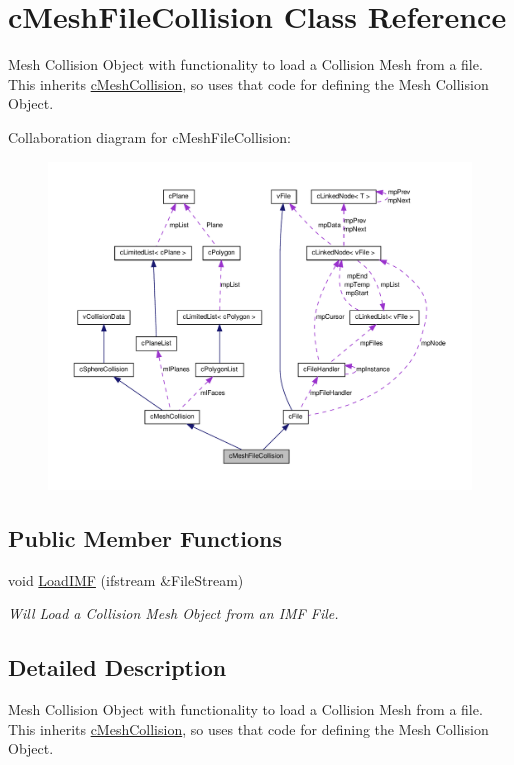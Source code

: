 \hypertarget{classc_mesh_file_collision}{
\section{cMeshFileCollision Class Reference}
\label{classc_mesh_file_collision}
}


Mesh Collision Object with functionality to load a Collision Mesh from a file. This inherits \hyperlink{classc_mesh_collision}{cMeshCollision}, so uses that code for defining the Mesh Collision Object.  




Collaboration diagram for cMeshFileCollision:\nopagebreak
\begin{figure}[H]
\begin{center}
\leavevmode
\includegraphics[width=400pt]{classc_mesh_file_collision__coll__graph}
\end{center}
\end{figure}
\subsection*{Public Member Functions}
\begin{DoxyCompactItemize}
\item 
\hypertarget{classc_mesh_file_collision_ac40c927ae3dfecfb2c9a0e40fbcd31b3}{
void \hyperlink{classc_mesh_file_collision_ac40c927ae3dfecfb2c9a0e40fbcd31b3}{LoadIMF} (ifstream \&FileStream)}
\label{classc_mesh_file_collision_ac40c927ae3dfecfb2c9a0e40fbcd31b3}

\begin{DoxyCompactList}\small\item\em Will Load a Collision Mesh Object from an IMF File. \end{DoxyCompactList}\end{DoxyCompactItemize}


\subsection{Detailed Description}
Mesh Collision Object with functionality to load a Collision Mesh from a file. This inherits \hyperlink{classc_mesh_collision}{cMeshCollision}, so uses that code for defining the Mesh Collision Object. 

